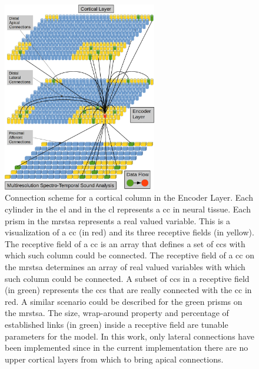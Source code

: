 \documentclass[11pt,a4paper]{article}
\begin{document}
\begin{figure}[h!]
    \centering
    \includegraphics[width=0.6\textwidth]{EncoderColumnConnections.png}
    \caption{Connection scheme for a cortical column in the Encoder Layer.
	    Each cylinder in the \gls{el} and in the \gls{cl} represents a \gls{cc} in neural tissue.
	    Each prism in the \gls{mrstsa} represents a real valued variable.
	    This is a visualization of a \gls{cc} (in red) and its three receptive fields (in yellow).
	    The receptive field of a \gls{cc} is an array that defines a set of \glspl{cc}
	    with which such column could be connected.
	    The receptive field of a \gls{cc} on the \gls{mrstsa} determines an array of real valued variables
	    with which such column could be connected.
    A subset of \glspl{cc} in a receptive field (in green) represents the \glspl{cc} that are really
    connected with the \gls{cc} in red. A similar scenario could be described for the green prisms on
    the \gls{mrstsa}.
    The size, wrap-around property and percentage of established links (in green) inside a receptive field are tunable parameters for the model.
    In this work, only lateral connections have been implemented since in the current implementation there are no upper cortical layers from which
    to bring apical connections.}
    \label{fig:EncoderColumnConnections}
\end{figure}
\end{document}
